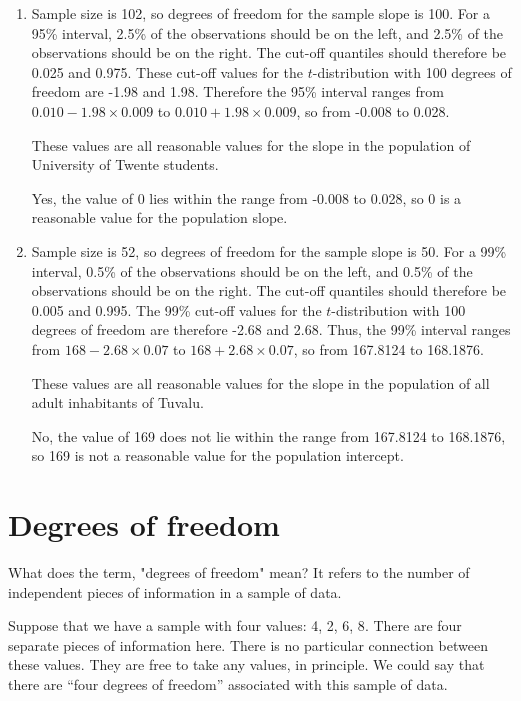 \documentclass[]{book}\usepackage[]{graphicx}\usepackage[]{color}
\begin{document}
\begin{enumerate}

\item Sample size is 102, so degrees of freedom for the sample slope is 100. For a 95\% interval, 2.5\% of the observations should be on the left, and 2.5\% of the observations should be on the right. The cut-off quantiles should therefore be 0.025 and 0.975. These cut-off values for the $t$-distribution with 100 degrees of freedom are -1.98 and 1.98. Therefore the 95\% interval ranges from $0.010 - 1.98 \times 0.009$ to $0.010 + 1.98 \times 0.009$, so from -0.008 to 0.028.

\subitem These values are all reasonable values for the slope in the population of University of Twente students.

\subitem Yes, the value of 0 lies within the range from -0.008 to 0.028, so 0 is a reasonable value for the population slope.

\item Sample size is 52, so degrees of freedom for the sample slope is 50. For a 99\% interval, 0.5\% of the observations should be on the left, and 0.5\% of the observations should be on the right. The cut-off quantiles should therefore be 0.005 and 0.995. The 99\% cut-off values for the $t$-distribution with 100 degrees of freedom are therefore -2.68 and 2.68. Thus, the 99\% interval ranges from $168 - 2.68 \times 0.07$ to $168 + 2.68 \times 0.07$, so from 167.8124 to 168.1876.

\subitem These values are all reasonable values for the slope in the population of all adult inhabitants of Tuvalu.

\subitem No, the value of 169 does not lie within the range from 167.8124 to 168.1876, so 169 is not a reasonable value for the population intercept.


\end{enumerate}


\section{Degrees of freedom}


What does the term, "degrees of freedom" mean? It refers to the number of independent pieces of information in a sample of data.

Suppose that we have a sample with four values: {4, 2, 6, 8}. There are four separate pieces of information here. There is no particular connection between these values. They are free to take any values, in principle. We could say that there are “four degrees of freedom” associated with this sample of data.
\end{document}
